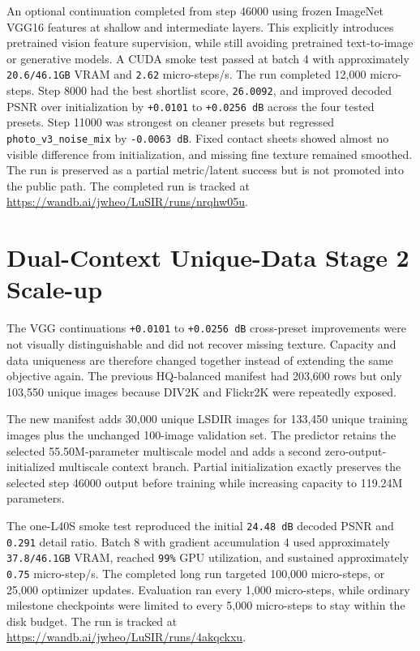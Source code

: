 \documentclass[
  10pt,
]{article}
\begin{document}
An optional continuation completed from step 46000 using frozen ImageNet
VGG16 features at shallow and intermediate layers. This explicitly
introduces pretrained vision feature supervision, while still avoiding
pretrained text-to-image or generative models. A CUDA smoke test passed
at batch 4 with approximately \texttt{20.6/46.1GB} VRAM and
\texttt{2.62} micro-steps/s. The run completed 12,000 micro-steps. Step
8000 had the best shortlist score, \texttt{26.0092}, and improved
decoded PSNR over initialization by \texttt{+0.0101} to
\texttt{+0.0256\ dB} across the four tested presets. Step 11000 was
strongest on cleaner presets but regressed
\texttt{photo\_v3\_noise\_mix} by \texttt{-0.0063\ dB}. Fixed contact
sheets showed almost no visible difference from initialization, and
missing fine texture remained smoothed. The run is preserved as a
partial metric/latent success but is not promoted into the public path.
The completed run is tracked at
\url{https://wandb.ai/jwheo/LuSIR/runs/nrqhw05u}.

\hypertarget{dual-context-unique-data-stage-2-scale-up}{%
\section{Dual-Context Unique-Data Stage 2
Scale-up}\label{dual-context-unique-data-stage-2-scale-up}}

The VGG continuation\textquotesingle s \texttt{+0.0101} to
\texttt{+0.0256\ dB} cross-preset improvements were not visually
distinguishable and did not recover missing texture. Capacity and data
uniqueness are therefore changed together instead of extending the same
objective again. The previous HQ-balanced manifest had 203,600 rows but
only 103,550 unique images because DIV2K and Flickr2K were repeatedly
exposed.

The new manifest adds 30,000 unique LSDIR images for 133,450 unique
training images plus the unchanged 100-image validation set. The
predictor retains the selected 55.50M-parameter multiscale model and
adds a second zero-output- initialized multiscale context branch.
Partial initialization exactly preserves the selected step 46000 output
before training while increasing capacity to 119.24M parameters.

The one-L40S smoke test reproduced the initial \texttt{24.48\ dB}
decoded PSNR and \texttt{0.291} detail ratio. Batch 8 with gradient
accumulation 4 used approximately \texttt{37.8/46.1GB} VRAM, reached
\texttt{99\%} GPU utilization, and sustained approximately \texttt{0.75}
micro-step/s. The completed long run targeted 100,000 micro-steps, or
25,000 optimizer updates. Evaluation ran every 1,000 micro-steps, while
ordinary milestone checkpoints were limited to every 5,000 micro-steps
to stay within the disk budget. The run is tracked at
\url{https://wandb.ai/jwheo/LuSIR/runs/4akqckxu}.
\end{document}
